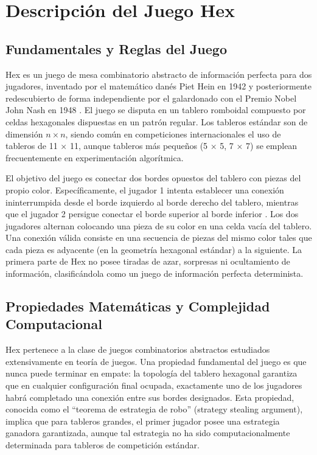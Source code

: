\documentclass[12pt]{article}
\begin{document}
\section{Descripción del Juego Hex}

\subsection{Fundamentales y Reglas del Juego}

Hex es un juego de mesa combinatorio abstracto de información perfecta para dos jugadores, inventado por el matemático danés Piet Hein en 1942 y posteriormente redescubierto de forma independiente por el galardonado con el Premio Nobel John Nash en 1948 \cite{Cazenave2009}. El juego se disputa en un tablero romboidal compuesto por celdas hexagonales dispuestas en un patrón regular. Los tableros estándar son de dimensión $n \times n$, siendo común en competiciones internacionales el uso de tableros de 11 × 11, aunque tableros más pequeños (5 × 5, 7 × 7) se emplean frecuentemente en experimentación algorítmica.

El objetivo del juego es conectar dos bordes opuestos del tablero con piezas del propio color. Específicamente, el jugador 1 intenta establecer una conexión ininterrumpida desde el borde izquierdo al borde derecho del tablero, mientras que el jugador 2 persigue conectar el borde superior al borde inferior \cite{Arneson2010}. Los dos jugadores alternan colocando una pieza de su color en una celda vacía del tablero. Una conexión válida consiste en una secuencia de piezas del mismo color tales que cada pieza es adyacente (en la geometría hexagonal estándar) a la siguiente. La primera parte de Hex no posee tiradas de azar, sorpresas ni ocultamiento de información, clasificándola como un juego de información perfecta determinista.

\subsection{Propiedades Matemáticas y Complejidad Computacional}

Hex pertenece a la clase de juegos combinatorios abstractos estudiados extensivamente en teoría de juegos. Una propiedad fundamental del juego es que nunca puede terminar en empate: la topología del tablero hexagonal garantiza que en cualquier configuración final ocupada, exactamente uno de los jugadores habrá completado una conexión entre sus bordes designados. Esta propiedad, conocida como el ``teorema de estrategia de robo'' (strategy stealing argument), implica que para tableros grandes, el primer jugador posee una estrategia ganadora garantizada, aunque tal estrategia no ha sido computacionalmente determinada para tableros de competición estándar.
\end{document}
